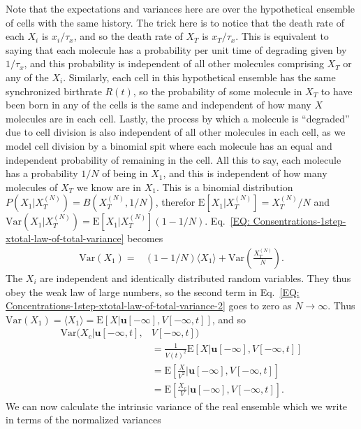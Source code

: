 \documentclass[%
 reprint,prx,
superscriptaddress,
%
%
%
%
%
%
%
%
%
 amsmath,amssymb,
 aps,
%
%
%
%
%
%
]{revtex4-2}
\begin{document}
{{Note that the expectations and variances here are over the hypothetical ensemble of cells with the same history. 
The trick here is to notice that the death rate of each $X_{i}$ is $x_{i}/\tau_{x}$,
and so the death rate of $X_{T}$ is $x_{T}/\tau_{x}$. This is 
equivalent to saying that each molecule has a probability per unit time of degrading 
given by $1/\tau_{x}$, and this probability is independent of all other molecules 
comprising $X_{T}$ or any of the $X_{i}$. Similarly, each cell in this hypothetical ensemble has the same synchronized birthrate $R(t)$, so the 
probability of some molecule in $X_{T}$ to have been born in any of the cells is 
the same and independent of how many $X$ molecules are in each cell. Lastly, the process by which 
a molecule is ``degraded'' due to cell division is also independent of all other molecules 
in each cell, as we model cell division by a binomial spit where each molecule 
has an equal and independent probability of remaining in the cell. All this to say, each molecule has a probability $1/N$ of being in $X_{1}$, and 
this is independent of how many molecules of $X_{T}$ we know are in $X_{1}$. 
This is a binomial distribution $P(X_{1}|X_{T}^{(N)}) = B(X_{T}^{(N)}, 1/N)$, therefor $\mathrm{E}[X_{1}|X_{T}^{(N)}] = X_{T}^{(N)}/N $ and $\text{Var}(X_{1}|X_{T}^{(N)}) = \mathrm{E}[X_{1}|X_{T}^{(N)}](1 - 1/N)$. Eq.~\eqref{EQ: Consentrations-1step-xtotal-law-of-total-variance} becomes
\begin{align}
 \text{Var}(X_{1})  =& (1 - 1/N)  \langle X_{1} \rangle
 + \text{Var}\left(\frac{X_{T}^{(N)}}{N}\right) .
 \label{EQ: Concentrations-1step-xtotal-law-of-total-variance-2}
\end{align}
The $X_{i}$ are independent and identically distributed random variables. They thus obey the weak law of large numbers, so the second term in Eq.~\eqref{EQ: Concentrations-1step-xtotal-law-of-total-variance-2} goes to zero as $N \to \infty$. Thus $\text{Var}(X_{1}) = \langle X_{1} \rangle = \mathrm{E}[X|\mathbf{u}[-\infty], V[-\infty,t]]$, and so
\begin{align*}
 \text{Var}(X_{c}|\mathbf{u}[-\infty,t], &V[-\infty,t]) \\
 &= \frac{1}{V(t)^{2}}\mathrm{E}[X|\mathbf{u}[-\infty], V[-\infty,t]]  
 \\&= \mathrm{E}\left[\frac{X}{V^{2}}\Big|\mathbf{u}[-\infty], V[-\infty,t]\right] 
 \\&= \mathrm{E}\left[\frac{X_{c}}{V}\Big|\mathbf{u}[-\infty], V[-\infty,t]\right].
\end{align*}
We can now calculate the intrinsic variance of the real ensemble which we write in terms of the normalized variances 
}}
\end{document}
